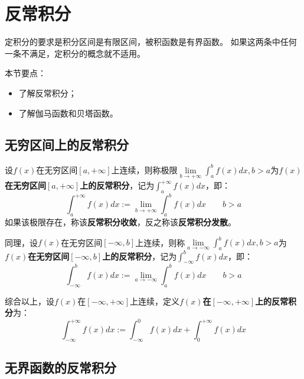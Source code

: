 \section{反常积分}

定积分的要求是积分区间是有限区间，被积函数是有界函数。
如果这两条中任何一条不满足，定积分的概念就不适用。

本节要点：
\begin{itemize}
    \item 了解反常积分；
    \item 了解伽马函数和贝塔函数。
\end{itemize}

\subsection{无穷区间上的反常积分}

\begin{definition}[无穷型反常积分]
设$f\left( x \right) $在无穷区间$\left[ a,+\infty \right] $上连续，则称极限$\underset{b\rightarrow +\infty}{\lim}\int_a^b{f\left( x \right) dx},b>a$为{\bf $f\left( x \right) $在无穷区间$\left[ a,+\infty \right] $上的反常积分}，记为$\int_a^{+\infty}{f\left( x \right) dx}$，即：
\[
\int_a^{+\infty}{f\left( x \right) dx}:=\underset{b\rightarrow +\infty}{\lim}\int_a^b{f\left( x \right) dx} \qquad b>a
\]
如果该极限存在，称该{\bf 反常积分收敛}，反之称该{\bf 反常积分发散}。

同理，设$f\left( x \right) $在无穷区间$\left[ -\infty ,b \right] $上连续，则称$\underset{a\rightarrow -\infty}{\lim}\int_a^b{f\left( x \right) dx},b>a$为{\bf $f\left( x \right) $在无穷区间$\left[ -\infty ,b \right] $上的反常积分}，记为$\int_{-\infty}^b{f\left( x \right) dx}$，即：
\[
\int_{-\infty}^b{f\left( x \right) dx}:=\underset{a\rightarrow -\infty}{\lim}\int_a^b{f\left( x \right) dx} \qquad b>a
\]

综合以上，设$f\left( x \right) $在$\left[ -\infty ,+\infty \right] $上连续，定义{\bf $f\left( x \right) $在$\left[ -\infty ,+\infty \right] $上的反常积分}为：
\[
\int_{-\infty}^{+\infty}{f\left( x \right) dx}:=\int_{-\infty}^0{f\left( x \right) dx}+\int_0^{+\infty}{f\left( x \right) dx}
\]
\end{definition}

\subsection{无界函数的反常积分}

